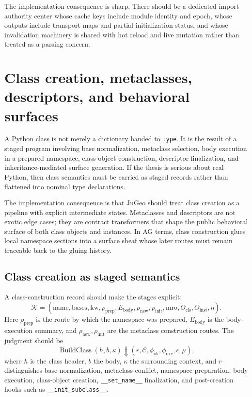 \documentclass[11pt]{report}
\begin{document}
The implementation consequence is sharp. There should be a dedicated import authority center whose cache keys include module identity and epoch, whose outputs include transport maps and partial-initialization status, and whose invalidation machinery is shared with hot reload and live mutation rather than treated as a parsing concern.
\chapter{Class creation, metaclasses, descriptors, and behavioral surfaces}
A Python class is not merely a dictionary handed to \texttt{type}. It is the result of a staged program involving base normalization, metaclass selection, body execution in a prepared namespace, class-object construction, descriptor finalization, and inheritance-mediated surface generation. If the thesis is serious about real Python, then class semantics must be carried as staged records rather than flattened into nominal type declarations.

The implementation consequence is that JuGeo should treat class creation as a pipeline with explicit intermediate states. Metaclasses and descriptors are not exotic edge cases; they are contract transformers that shape the public behavioral surface of both class objects and instances. In AG terms, class construction glues local namespace sections into a surface sheaf whose later routes must remain traceable back to the gluing history.
\section{Class creation as staged semantics}
 A class-construction record should make the stages explicit:
\[
\mathcal{K} = (\mathrm{name},\mathrm{bases},\mathrm{kw},\rho_{\mathrm{prep}},E_{\mathrm{body}},\rho_{\mathrm{new}},\rho_{\mathrm{init}},\mathrm{mro},\Theta_{\mathrm{cls}},\Theta_{\mathrm{inst}},\eta).
\]
Here $\rho_{\mathrm{prep}}$ is the route by which the namespace was prepared, $E_{\mathrm{body}}$ is the body-execution summary, and $\rho_{\mathrm{new}},\rho_{\mathrm{init}}$ are the metaclass construction routes. The judgment should be
\[
\operatorname{BuildClass}(h,b,\kappa) \Downarrow (r,\mathcal{C},\phi_{\mathrm{ok}},\phi_{\mathrm{exc}},\epsilon,\mu),
\]
where $h$ is the class header, $b$ the body, $\kappa$ the surrounding context, and $r$ distinguishes base-normalization, metaclass conflict, namespace preparation, body execution, class-object creation, \texttt{\_\_set\_name\_\_} finalization, and post-creation hooks such as \texttt{\_\_init\_subclass\_\_}.
\end{document}
